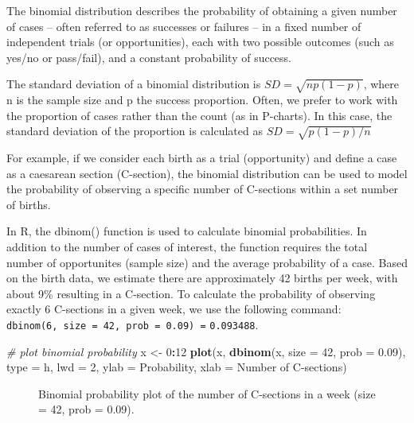 \documentclass[
]{book}
\makeatletter
\newenvironment{Shaded}{\begin{snugshade}}{\end{snugshade}}
\newcommand{\AttributeTok}[1]{\textcolor[rgb]{0.13,0.29,0.53}{#1}}
\newcommand{\CommentTok}[1]{\textcolor[rgb]{0.56,0.35,0.01}{\textit{#1}}}
\newcommand{\DecValTok}[1]{\textcolor[rgb]{0.00,0.00,0.81}{#1}}
\newcommand{\FloatTok}[1]{\textcolor[rgb]{0.00,0.00,0.81}{#1}}
\newcommand{\FunctionTok}[1]{\textcolor[rgb]{0.13,0.29,0.53}{\textbf{#1}}}
\newcommand{\NormalTok}[1]{#1}
\newcommand{\OtherTok}[1]{\textcolor[rgb]{0.56,0.35,0.01}{#1}}
\newcommand{\SpecialCharTok}[1]{\textcolor[rgb]{0.81,0.36,0.00}{\textbf{#1}}}
\newcommand{\StringTok}[1]{\textcolor[rgb]{0.31,0.60,0.02}{#1}}
\newcommand*\pandocbounded[1]{%
  \sbox\pandoc@box{#1}%
  \Gscale@div\@tempa{\textheight}{\dimexpr\ht\pandoc@box+\dp\pandoc@box\relax}%
  \Gscale@div\@tempb{\linewidth}{\wd\pandoc@box}%
  \ifdim\@tempb\p@<\@tempa\p@\let\@tempa\@tempb\fi%
  \ifdim\@tempa\p@<\p@\scalebox{\@tempa}{\usebox\pandoc@box}%
  \else\usebox{\pandoc@box}%
  \fi%
}
\makeatother
\begin{document}
The binomial distribution describes the probability of obtaining a given number of cases -- often referred to as successes or failures -- in a fixed number of independent trials (or opportunities), each with two possible outcomes (such as yes/no or pass/fail), and a constant probability of success.

The standard deviation of a binomial distribution is \(SD = \sqrt{np(1-p)}\), where n is the sample size and p the success proportion. Often, we prefer to work with the proportion of cases rather than the count (as in P-charts). In this case, the standard deviation of the proportion is calculated as \(SD = \sqrt{p(1-p)/n}\)

For example, if we consider each birth as a trial (opportunity) and define a case as a caesarean section (C-section), the binomial distribution can be used to model the probability of observing a specific number of C-sections within a set number of births.

In R, the dbinom() function is used to calculate binomial probabilities. In addition to the number of cases of interest, the function requires the total number of opportunites (sample size) and the average probability of a case. Based on the birth data, we estimate there are approximately 42 births per week, with about 9\% resulting in a C-section. To calculate the probability of observing exactly 6 C-sections in a given week, we use the following command:
\texttt{dbinom(6,\ size\ =\ 42,\ prob\ =\ 0.09)\ =} \texttt{0.093488}.

\begin{Shaded}
\begin{Highlighting}[]
\CommentTok{\# plot binomial probability}
\NormalTok{x }\OtherTok{\textless{}{-}} \DecValTok{0}\SpecialCharTok{:}\DecValTok{12}
\FunctionTok{plot}\NormalTok{(x, }\FunctionTok{dbinom}\NormalTok{(x, }\AttributeTok{size =} \DecValTok{42}\NormalTok{, }\AttributeTok{prob =} \FloatTok{0.09}\NormalTok{), }
     \AttributeTok{type =} \StringTok{\textquotesingle{}h\textquotesingle{}}\NormalTok{, }
     \AttributeTok{lwd  =} \DecValTok{2}\NormalTok{,}
     \AttributeTok{ylab =} \StringTok{\textquotesingle{}Probability\textquotesingle{}}\NormalTok{,}
     \AttributeTok{xlab =} \StringTok{\textquotesingle{}Number of C{-}sections\textquotesingle{}}\NormalTok{)}
\end{Highlighting}
\end{Shaded}

\begin{figure}
\centering
\pandocbounded{}
\caption{\label{fig:stat-dbinom1}Binomial probability plot of the number of C-sections in a week (size = 42, prob = 0.09).}
\end{figure}
\end{document}
